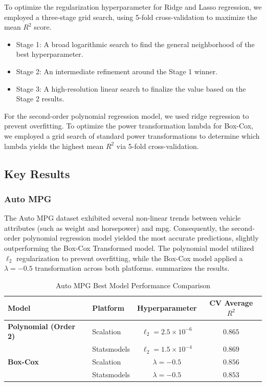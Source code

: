 \documentclass{article}
\begin{document}
To optimize the regularization hyperparameter for Ridge and Lasso regression, we employed a three-stage grid search, using 5-fold cross-validation to maximize the mean $R^2$ score.
\begin{itemize}
	\item Stage 1: A broad logarithmic search to find the general neighborhood of the best hyperparameter.
	\item Stage 2: An intermediate refinement around the Stage 1 winner.
	\item Stage 3: A high-resolution linear search to finalize the value based on the Stage 2 results.
\end{itemize}
For the second-order polynomial regression model, we used ridge regression to prevent overfitting. To optimize the power transformation lambda for Box-Cox, we employed a grid search of standard power transformations to determine which lambda yields the highest mean $R^2$ via 5-fold cross-validation.

\subsection{Key Results}

\subsubsection{Auto MPG}

The Auto MPG dataset exhibited several non-linear trends between vehicle attributes (such as weight and horsepower) and mpg. Consequently, the second-order polynomial regression model yielded the most accurate predictions, slightly outperforming the Box-Cox Transformed model. The polynomial model utilized $\ell_2$ regularization to prevent overfitting, while the Box-Cox model applied a $\lambda = -0.5$ transformation across both platforms.  summarizes the results.

\begin{table}[H]
\centering
\caption{Auto MPG Best Model Performance Comparison}
\label{tab:Auto MPG Best Model Performance Comparison}
\begin{tabular}{@{}llcc@{}}
\toprule
\textbf{Model} & \textbf{Platform} & \textbf{Hyperparameter} & \textbf{CV Average $R^2$} \\ \midrule
\textbf{Polynomial (Order 2)} & Scalation   & $\ell_2 = 2.5 \times 10^{-6}$ & $0.865$ \\
                              & Statsmodels & $\ell_2 = 1.5 \times 10^{-4}$ & $0.869$ \\ \addlinespace
\textbf{Box-Cox}              & Scalation   & $\lambda = -0.5$              & $0.856$ \\
                              & Statsmodels & $\lambda = -0.5$              & $0.853$ \\ \bottomrule
\end{tabular}
\end{table}
\end{document}
